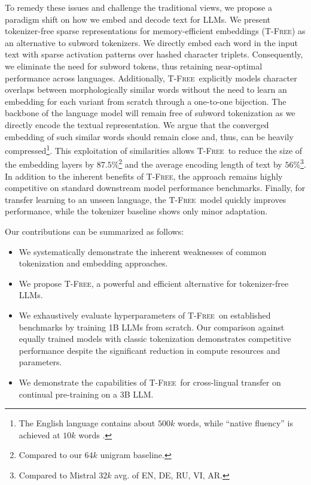 \documentclass[11pt]{article}
\newcommand{\method}{\textsc{T-Free}}
\begin{document}
To remedy these issues and challenge the traditional views, we propose a paradigm shift on how we embed and decode text for LLMs. We present tokenizer-free sparse representations for memory-efficient embeddings (\method) as an alternative to subword tokenizers. We directly embed each word in the input text with sparse activation patterns over hashed character triplets. Consequently, we eliminate the need for subword tokens, thus retaining near-optimal performance across languages. 
Additionally, \method~explicitly models character overlaps between morphologically similar words without the need to learn an embedding for each variant from scratch through a one-to-one bijection. The backbone of the language model will remain free of subword tokenization as we directly encode the textual representation. 
We argue that the converged embedding of such similar words should remain close and, thus, can be heavily compressed\footnote{The English language contains about $500k$ words, while ``native fluency'' is achieved at $10k$ words \cite{nation2006large}.}.
This exploitation of similarities allows \method~to reduce the size of the embedding layers by $87.5\%$\footnote{Compared to our $64k$ unigram baseline.} and the average encoding length of text by $56\%$\footnote{Compared to Mistral $32k$ avg. of EN, DE, RU, VI, AR.}. In addition to the inherent benefits of \method, the approach remains highly competitive on standard downstream model performance benchmarks. 
Finally, for transfer learning to an unseen language, the \method\ model quickly improves performance, while the tokenizer baseline shows only minor adaptation.


Our contributions can be summarized as follows: 
\begin{itemize} %
    \item We systematically demonstrate the inherent weaknesses of common tokenization and embedding approaches. 
    \item We propose \method, a powerful and efficient alternative for tokenizer-free LLMs.
    \item We exhaustively evaluate hyperparameters of \method~on established benchmarks by training 1B LLMs from scratch. Our comparison against equally trained models with classic tokenization demonstrates competitive performance despite the significant reduction in compute resources and parameters.
    \item We demonstrate the capabilities of \method~for cross-lingual transfer on continual pre-training %
    on a 3B LLM. %
\end{itemize}
\end{document}
